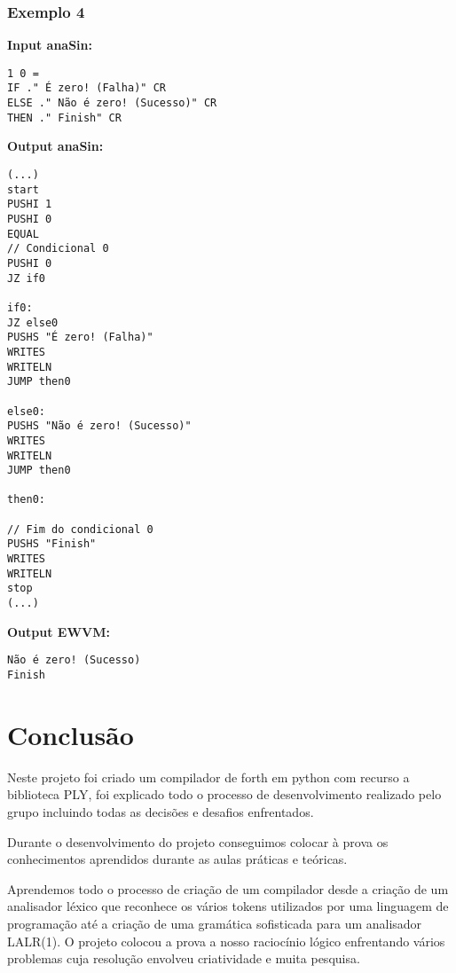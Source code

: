 \documentclass{article}
\begin{document}
\subsubsection{Exemplo 4}
\begin{minipage}[t]{0.6\textwidth}
\textbf{Input anaSin:} 
\begin{verbatim}
1 0 = 
IF ." É zero! (Falha)" CR
ELSE ." Não é zero! (Sucesso)" CR
THEN ." Finish" CR
\end{verbatim}
\end{minipage}
\hfill
\begin{minipage}[t]{0.4\textwidth}
\textbf{Output anaSin:} 
\begin{verbatim}
(...)
start
PUSHI 1
PUSHI 0
EQUAL
// Condicional 0
PUSHI 0
JZ if0

if0:
JZ else0
PUSHS "É zero! (Falha)"
WRITES
WRITELN
JUMP then0

else0:
PUSHS "Não é zero! (Sucesso)"
WRITES
WRITELN
JUMP then0

then0:

// Fim do condicional 0
PUSHS "Finish"
WRITES
WRITELN
stop
(...)
\end{verbatim}
\end{minipage}
\begin{minipage}[t]{0.10\textwidth}
\textbf{Output EWVM:} 
\begin{verbatim}
Não é zero! (Sucesso)
Finish
\end{verbatim}
\end{minipage}



\section{Conclusão}
Neste projeto foi criado um compilador de forth em python com recurso a biblioteca PLY, foi explicado todo o processo de desenvolvimento realizado pelo grupo incluindo todas as decisões e desafios enfrentados.

Durante o desenvolvimento do projeto conseguimos colocar à prova os conhecimentos aprendidos durante as aulas práticas e teóricas. 

Aprendemos todo o processo de criação de um compilador desde a criação de um analisador léxico que reconhece os vários tokens utilizados por uma linguagem de programação até a criação de uma gramática sofisticada para um analisador LALR(1). O projeto colocou a prova a nosso raciocínio lógico enfrentando vários problemas cuja resolução envolveu criatividade e muita pesquisa. 
\end{document}
